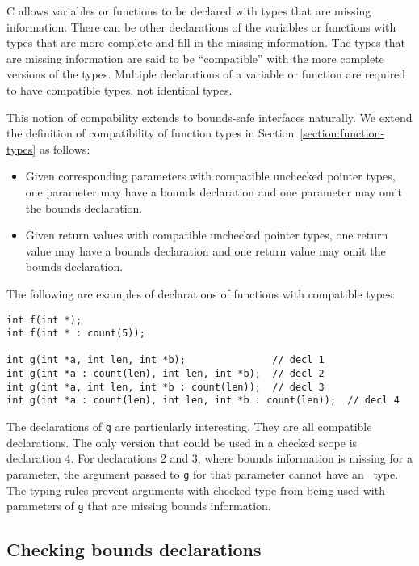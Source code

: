 C allows variables or functions to be declared with types that are missing information.
There can be other declarations of the variables or functions with types that are more complete
and fill in the missing information.  The types that are missing information are said to be
``compatible'' with the more complete versions of the types.  Multiple declarations of
a variable or function are required to have compatible types, not identical types.

This notion of compability extends to bounds-safe interfaces naturally.  We extend the
definition of compatibility of function types in Section~\ref{section:function-types} as follows:
\begin{itemize}
\item Given corresponding parameters with compatible unchecked pointer types,
one parameter may have a bounds declaration and one parameter may omit the bounds declaration.
\item Given return values with compatible unchecked pointer types, one
return value may have a bounds declaration and one return value may omit the bounds declaration.
\end{itemize}

The following are examples of declarations of functions with compatible types:
\begin{verbatim}
int f(int *);
int f(int * : count(5));

int g(int *a, int len, int *b);               // decl 1
int g(int *a : count(len), int len, int *b);  // decl 2
int g(int *a, int len, int *b : count(len));  // decl 3
int g(int *a : count(len), int len, int *b : count(len));  // decl 4
\end{verbatim}
The declarations of \texttt{g} are particularly interesting. They are all
compatible declarations.  The only version
that could be used in a checked scope is declaration 4.   For declarations 2 and 3,
where bounds information is missing for a parameter, the argument passed to \texttt{g}
for that parameter cannot have an \arrayptr\ type.  The typing rules prevent arguments
with checked type from being used with parameters of \texttt{g} that are missing
bounds information.

\subsection{Checking bounds declarations}
\label{section:checking-bounds-interfaces}

